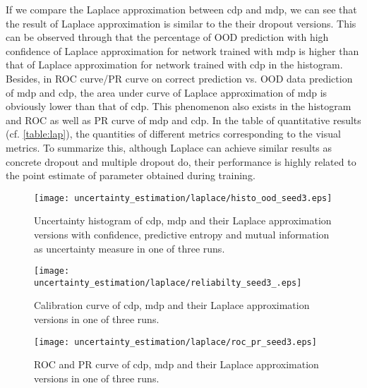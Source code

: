 If we compare the Laplace approximation between cdp and mdp, we can see that the result of Laplace approximation is similar to the their dropout versions. This can be observed through that the percentage of OOD prediction with high confidence of Laplace approximation for network trained with mdp is higher than that of Laplace approximation for network trained with cdp in the histogram. Besides, in ROC curve/PR curve on correct prediction vs. OOD data prediction of mdp and cdp, the area under curve of Laplace approximation of mdp is obviously lower than that of cdp. This phenomenon also exists in the histogram and ROC as well as PR curve of mdp and cdp. In the table of quantitative results (cf. \ref{table:lap}), the quantities of different metrics corresponding to the visual metrics. To summarize this, although Laplace can achieve similar results as concrete dropout and multiple dropout do, their performance is highly related to the point estimate of parameter obtained during training.

\begin{figure}[H]		
	\centering
	\texttt{[image: uncertainty\_estimation/laplace/histo\_ood\_seed3.eps]}
	\caption{Uncertainty histogram of cdp, mdp and their Laplace approximation versions with confidence, predictive entropy and mutual information as uncertainty measure in one of three runs.}
	\label{figure:lap_hist}	
\end{figure}

\begin{figure}[H]
	\begin{center}
		\texttt{[image: uncertainty\_estimation/laplace/reliabilty\_seed3\_.eps]}
		\caption{Calibration curve of cdp, mdp and their Laplace approximation versions in one of three runs.}		
		\label{lap_calibration}
	\end{center}
\end{figure}



\begin{figure}[H]
	\begin{center}
		\texttt{[image: uncertainty\_estimation/laplace/roc\_pr\_seed3.eps]}
		\caption{ROC and PR curve of cdp, mdp and their Laplace approximation versions in one of three runs.}		
		\label{lap_roc_pr}
	\end{center}
\end{figure}

